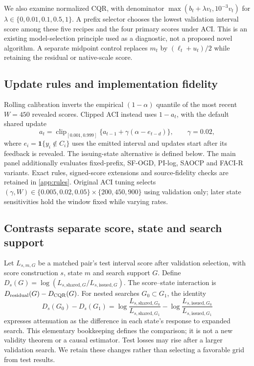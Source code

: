 \documentclass[preprint,11pt]{elsarticle}
\newcommand{\ind}{\mathbf{1}}
\newcommand{\clip}{\operatorname{clip}}
\begin{document}
We also examine normalized CQR, with denominator
$\max(b_t+\lambda v_t,10^{-3}v_t)$ for $\lambda\in\{0,0.01,0.1,0.5,1\}$.
A prefix selector chooses the lowest validation interval score among these five recipes
and the four primary scores under ACI. This is an existing model-selection principle used
as a diagnostic, not a proposed novel algorithm. A separate midpoint control replaces
$m_t$ by $(\ell_t+u_t)/2$ while retaining the residual or native-scale score.

\subsection{Update rules and implementation fidelity}
Rolling calibration inverts the empirical $(1-\alpha)$ quantile of the most recent
$W=450$ revealed scores. Clipped ACI instead uses $1-a_t$, with the default shared update
\begin{equation}\label{eq:aci}
a_t=\clip_{[0.001,0.999]}\{a_{t-1}+\gamma(\alpha-e_{t-d})\},\qquad\gamma=0.02,
\end{equation}
where $e_i=\ind\{y_i\notin C_i\}$ uses the emitted interval and updates start after
its feedback is revealed. The issuing-state alternative is defined below.
The main panel additionally evaluates fixed-prefix, SF-OGD, PI-log, SAOCP and FACI-R
variants. Exact rules, signed-score extensions and source-fidelity checks are retained
in \ref{app:rules}. Original ACI tuning selects
$(\gamma,W)\in\{0.005,0.02,0.05\}\times\{200,450,900\}$ using validation only;
later state sensitivities hold the window fixed while varying rates.

\subsection{Contrasts separate score, state and search support}
Let $L_{s,m,G}$ be a matched pair's test interval score after validation selection,
with score construction $s$, state $m$ and search support $G$. Define
$D_s(G)=\log(L_{s,\mathrm{shared},G}/L_{s,\mathrm{issued},G})$.
The score--state interaction is $D_{\rm residual}(G)-D_{\rm CQR}(G)$.
For nested searches $G_0\subset G_1$, the identity
\begin{equation}
D_s(G_0)-D_s(G_1)=
\log\frac{L_{s,\mathrm{shared},G_0}}{L_{s,\mathrm{shared},G_1}}-
\log\frac{L_{s,\mathrm{issued},G_0}}{L_{s,\mathrm{issued},G_1}}
\end{equation}
expresses attenuation as the difference in each state's response to expanded search.
This elementary bookkeeping defines the comparison; it is not a new validity theorem
or a causal estimator. Test losses may rise after a larger validation search. We retain
these changes rather than selecting a favorable grid from test results.
\end{document}
